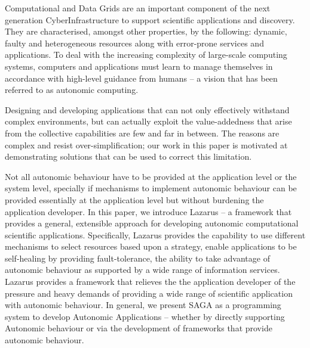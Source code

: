 \documentclass{sig-alternate}
\begin{document}
Computational and Data Grids are an important component of the next
generation CyberInfrastructure to support scientific applications and
discovery.  They are characterised, amongst other properties, by
the following: dynamic, faulty and heterogeneous resources along with
error-prone services and applications.  To deal with the increasing
complexity of large-scale computing systems, computers and
applications must learn to manage themselves in accordance with
high-level guidance from humans -- a vision that has been referred to
as autonomic computing.

Designing and developing applications that can not only effectively withstand complex environments, but can actually exploit the value-addedness that arise from the collective capabilities are few and far in between. The reasons are complex and resist over-simplification; our work in this paper is motivated at demonstrating solutions that can be used to correct this limitation.

Not all autonomic behaviour have to be provided at the application
level or the system level, specially if mechanisms to implement
autonomic behaviour can be provided essentially at the application
level but without burdening the application developer.  In this paper,
we introduce Lazarus -- a framework that provides a general,
extensible approach for developing autonomic computational scientific
applications. Specifically, Lazarus provides the capability to use
different mechanisms to select resources based upon a strategy, enable
applications to be self-healing by providing fault-tolerance, the
ability to take advantage of autonomic behaviour as supported by a
wide range of information services. Lazarus provides a framework that
relieves the the application developer of the pressure and heavy
demands of providing a wide range of scientific application with
autonomic behaviour.  In general, we present SAGA as a programming
system to develop Autonomic Applications -- whether by directly
supporting Autonomic behaviour or via the development of frameworks
that provide autonomic behaviour.



\end{document}
